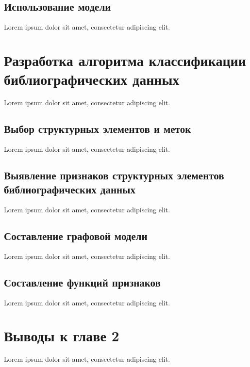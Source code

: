 \subsection{Использование модели}
Lorem ipsum dolor sit amet, consectetur adipiscing elit.

\section{Разработка алгоритма классификации библиографических данных}
Lorem ipsum dolor sit amet, consectetur adipiscing elit.

\subsection{Выбор структурных элементов и меток}
Lorem ipsum dolor sit amet, consectetur adipiscing elit.

\subsection{Выявление признаков структурных элементов библиографических данных}
Lorem ipsum dolor sit amet, consectetur adipiscing elit.

\subsection{Составление графовой модели}
Lorem ipsum dolor sit amet, consectetur adipiscing elit.

\subsection{Составление функций признаков}
Lorem ipsum dolor sit amet, consectetur adipiscing elit.

\section*{Выводы к главе 2}
Lorem ipsum dolor sit amet, consectetur adipiscing elit.
